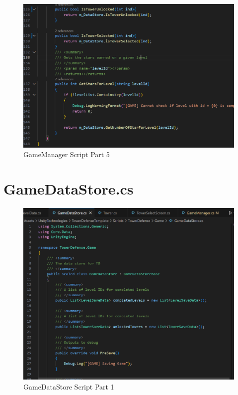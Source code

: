\documentclass[12pt,a4paper]{report}
\begin{document}
\begin{figure}[h!]
	\centering
	\includegraphics[scale=0.75]{images/GameManager5.png}
	\caption{GameManager Script Part 5}
	\label{fig:GameManager5}
\end{figure}

\section{GameDataStore.cs}
\begin{figure}[h!]
	\centering
	\includegraphics[scale=0.75]{images/GameDataStore1.png}
	\caption{GameDataStore Script Part 1}
	\label{fig:GameDataStore1}
\end{figure}
 
\end{document}
